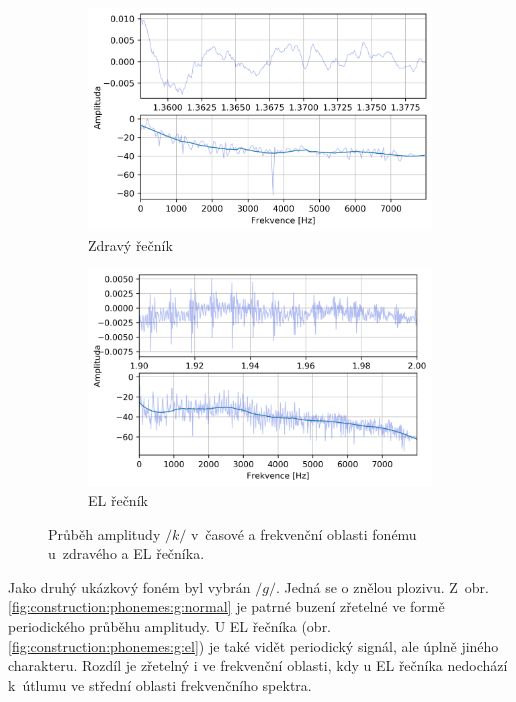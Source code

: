 \begin{figure}[htpb]
  \centering
  \begin{subfigure}[b]{0.45\textwidth}
    \includegraphics[width=\textwidth]{./parts/ch5-construction/img/signal-normal_k.png}
    \caption{Zdravý řečník}
    \label{fig:construction:phonemes:k:normal}
  \end{subfigure}
  \begin{subfigure}[b]{0.45\textwidth}
    \includegraphics[width=\textwidth]{./parts/ch5-construction/img/signal-el_k.png}
    \caption{EL řečník}
    \label{fig:construction:phonemes:k:el}
  \end{subfigure}
  \caption[Průběh amplitudy fonému $/k/$ zdravého a EL řečníka.]{Průběh amplitudy $/k/$ v~časové a frekvenční oblasti fonému u~zdravého a EL řečníka.}
  \label{fig:construction:phonemes:k}
\end{figure}

Jako druhý ukázkový foném byl vybrán $/g/$.
Jedná se o znělou plozivu.
Z~obr. \ref{fig:construction:phonemes:g:normal} je patrné buzení zřetelné ve formě periodického průběhu amplitudy.
U EL řečníka (obr. \ref{fig:construction:phonemes:g:el}) je také vidět periodický signál, ale úplně jiného charakteru.
Rozdíl je zřetelný i ve frekvenční oblasti, kdy u EL řečníka nedochází  k~útlumu ve střední oblasti frekvenčního spektra.

